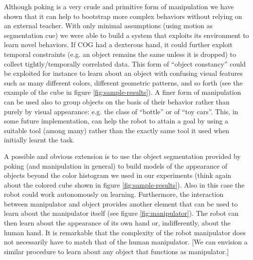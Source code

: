 Although poking is a very crude and primitive form of manipulation we have
shown that it can help to bootstrap more complex behaviors without relying on 
an external teacher. With only minimal assumptions (using motion as segmentation
cue) we were able to build a system that exploits its environment to 
learn novel behaviors. If COG had a dexterous hand, it could further
exploit temporal constraints (e.g. an object remains the same unless it is dropped)
to collect tightly/temporally correlated data. This form of ``object constancy'' could be 
exploited for instance to learn about an object with confusing visual features such
as many different colors, different geometric patterns, and so forth  
(see the example of the cube in figure \ref{fig:sample-results}). A finer form of manipulation can be
used also to group objects on the basis of their behavior rather than purely
by visual appearance: e.g. the class of ``bottle'' or of ``toy cars''.
This, in some future implementation, can help the robot to attain a goal by using
a suitable tool (among many) rather than the exactly same tool it used
when initially learnt the task.

A possible and obvious extension is to use the object segmentation provided 
by poking (and manipulation in general) to build models of the appearance of objects 
beyond the color histogram we used in our experiments (think again about the
colored cube shown in figure \ref{fig:sample-results}).
Also in this case the robot could work autonomously on learning. Furthermore, the
interaction between manipulator and object provides another element that can
be used to learn about the manipulator itself (see figure \ref{fig:manipulator}). 
The robot can then learn about the appearance of its own hand or, 
indifferently, about the human hand. It is 
remarkable that the complexity of the robot manipulator does not necessarily have to
match that of the human manipulator. [We can envision a similar procedure to learn about 
any object that functions as manipulator.]




